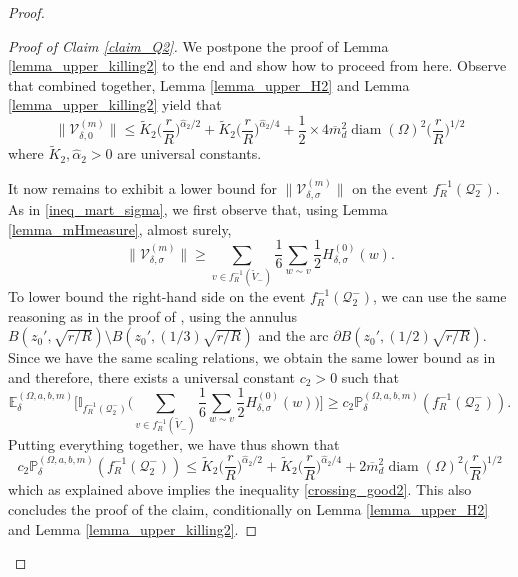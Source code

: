 \documentclass{article}
\newcommand{\PP}{{\mathbb{P}}}
\newcommand{\EE}{{\mathbb{E}}}
\theoremstyle{definition}
\theoremstyle{remark}
\theoremstyle{remark}
\begin{document}
\begin{proof}
\begin{proof}[Proof of Claim \ref{claim_Q2}]
We postpone the proof of Lemma \ref{lemma_upper_killing2} to the end and show how to proceed from here. Observe that combined together, Lemma \ref{lemma_upper_H2} and Lemma \ref{lemma_upper_killing2} yield that
\begin{equation*}
    \| \mathcal{V}_{\delta, 0}^{(m)}\| \leq \tilde K_2 \bigg( \frac{r}{R}\bigg)^{\hat \alpha_2 /2} + \tilde K_2 \bigg( \frac{r}{R}\bigg)^{\hat \alpha_2 /4} + \frac{1}{2} \times 4\overline{m}_d^2\operatorname{diam}(\Omega)^{2} \bigg( \frac{r}{R}\bigg)^{1/2}
\end{equation*}
where $\tilde K_2, \hat \alpha_2 >0$ are universal constants.

It now remains to exhibit a lower bound for $\| \mathcal{V}_{\delta, \sigma}^{(m)}\|$ on the event $f_{R}^{-1}(\mathcal{Q}_2^{-})$. As in \eqref{ineq_mart_sigma}, we first observe that, using Lemma \ref{lemma_mHmeasure}, almost surely,
\begin{equation*}
    \| \mathcal{V}^{(m)}_{\delta, \sigma} \| \geq \sum_{v \in f_{R}^{-1}(\tilde V_{-})} \frac{1}{6} \sum_{w \sim v} \frac{1}{2} H_{\delta, \sigma}^{(0)}(w).
\end{equation*}
To lower bound the right-hand side on the event $f_R^{-1}(\mathcal{Q}_2^{-})$, we can use the same reasoning as in the proof of \cite[Propostion~6.3]{HE}, using the annulus $B(z_0', \sqrt{r/R}) \setminus B(z_0', (1/3)\sqrt{r/R})$ and the arc $\partial B(z_0', (1/2)\sqrt{r/R})$. Since we have the same scaling relations, we obtain the same lower bound as in \cite[Propostion~6.3]{HE} and therefore, there exists a universal constant $c_2 >0$ such that
\begin{equation*}
    \EE^{(\Omega,a,b,m)}_{\delta} \bigg[ \mathbb{I}_{f_R^{-1}(\mathcal{Q}_2^{-})} \bigg( \sum_{v \in f_{R}^{-1}(\tilde V_{-})} \frac{1}{6} \sum_{w \sim v} \frac{1}{2} H_{\delta, \sigma}^{(0)}(w)\bigg) \bigg] \geq c_2\PP^{(\Omega,a,b,m)}_{\delta}(f_{R}^{-1}(\mathcal{Q}_2^{-})).
\end{equation*}
Putting everything together, we have thus shown that
\begin{equation*}
    c_2 \PP_{\delta}^{(\Omega,a,b,m)}(f_R^{-1}(\mathcal{Q}_{2}^{-})) \leq \tilde K_2 \bigg( \frac{r}{R}\bigg)^{\hat \alpha_2 /2} + \tilde K_2 \bigg( \frac{r}{R}\bigg)^{\hat \alpha_2 /4} + 2\overline{m}_d^2\operatorname{diam}(\Omega)^{2} \bigg( \frac{r}{R}\bigg)^{1/2}
\end{equation*}
which as explained above implies the inequality \eqref{crossing_good2}. This also concludes the proof of the claim, conditionally on Lemma \ref{lemma_upper_H2} and Lemma \ref{lemma_upper_killing2}.
\end{proof}


\end{proof}
\end{document}

